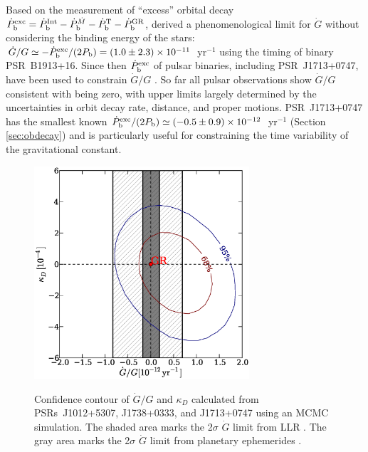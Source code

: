 Based on the measurement of ``excess'' orbital decay 
$\dot{P}_{\rm b}^{\rm exc}=\dot{P}_{\rm b}^{\rm Int} - \dot{P}_{\rm
b}^{\dot{M}}  - \dot{P}_{\rm b}^{\rm T} - \dot{P}_{\rm b}^{\rm GR}$,
\citet{dgt88} derived a phenomenological limit for $\dot{G}$ without considering the binding energy of the stars: 
$\dot{G}/G\simeq-\dot{P}_{\rm b}^{\rm exc}/(2P_{\rm
b})=(1.0\pm2.3)\times10^{-11}$~yr$^{-1}$ using the timing of binary PSR~B1913+16. 
Since then $\dot{P}_{\rm b}^{\rm exc}$ of pulsar binaries, including 
PSR~J1713+0747, have been used to 
constrain $\dot{G}/G$ \citep{ktr94, nss+05, dvtb08, lwj+09, fwe+12}. 
So far all pulsar observations show $\dot{G}/G$ consistent with being zero, with 
upper limits largely determined by the uncertainties in orbit decay rate, distance, 
and proper motions.
PSR~J1713+0747 has the smallest known $\dot{P}_{\rm b}^{\rm exc}/(2P_{\rm
b})\simeq(-0.5\pm0.9)\times10^{-12}$~yr$^{-1}$ (Section \ref{sec:obdecay}) and is
particularly useful for constraining the time variability of the gravitational
constant.

\begin{figure}
\includegraphics[width=8cm]{finalGdot.ps} \\ 
\caption {\label{fig:Gdot} Confidence contour of $\dot{G}/G$ and $\kappa_D$
calculated from PSRs~J1012+5307, J1738+0333, and J1713+0747 using an MCMC simulation.
The shaded area marks the 2$\sigma$ $\dot{G}$ limit from LLR \citep{hmb10}. The gray area
marks the 2$\sigma$ $\dot{G}$ limit from planetary ephemerides \citep{fle+14}.
} 
\end{figure} 

